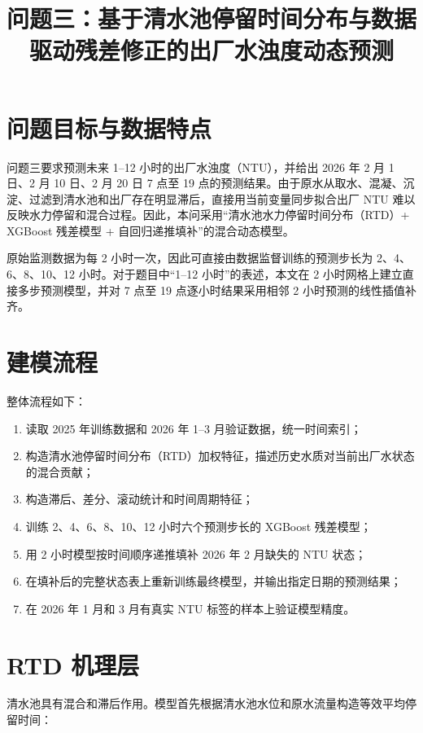 \documentclass[UTF8,a4paper,12pt]{ctexart}
\title{问题三：基于清水池停留时间分布与数据驱动残差修正的出厂水浊度动态预测}
\author{}
\date{}
\begin{document}
\maketitle

\section{问题目标与数据特点}

问题三要求预测未来 1--12 小时的出厂水浊度（NTU），并给出 2026 年 2 月 1 日、2 月 10 日、2 月 20 日 7 点至 19 点的预测结果。由于原水从取水、混凝、沉淀、过滤到清水池和出厂存在明显滞后，直接用当前变量同步拟合出厂 NTU 难以反映水力停留和混合过程。因此，本问采用“清水池水力停留时间分布（RTD）+ XGBoost 残差模型 + 自回归递推填补”的混合动态模型。

原始监测数据为每 2 小时一次，因此可直接由数据监督训练的预测步长为 2、4、6、8、10、12 小时。对于题目中“1--12 小时”的表述，本文在 2 小时网格上建立直接多步预测模型，并对 7 点至 19 点逐小时结果采用相邻 2 小时预测的线性插值补齐。

\section{建模流程}

整体流程如下：

\begin{enumerate}
  \item 读取 2025 年训练数据和 2026 年 1--3 月验证数据，统一时间索引；
  \item 构造清水池停留时间分布（RTD）加权特征，描述历史水质对当前出厂水状态的混合贡献；
  \item 构造滞后、差分、滚动统计和时间周期特征；
  \item 训练 2、4、6、8、10、12 小时六个预测步长的 XGBoost 残差模型；
  \item 用 2 小时模型按时间顺序递推填补 2026 年 2 月缺失的 NTU 状态；
  \item 在填补后的完整状态表上重新训练最终模型，并输出指定日期的预测结果；
  \item 在 2026 年 1 月和 3 月有真实 NTU 标签的样本上验证模型精度。
\end{enumerate}

\section{RTD 机理层}

清水池具有混合和滞后作用。模型首先根据清水池水位和原水流量构造等效平均停留时间：
\end{document}
